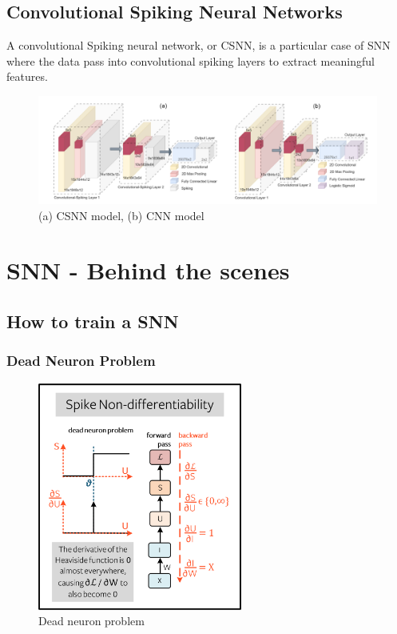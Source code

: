 \documentclass[11pt]{article}
\begin{document}
\subsection{Convolutional Spiking Neural Networks}

A convolutional Spiking neural network, or CSNN, is a particular case of SNN where the data pass into convolutional spiking layers to extract meaningful features.


\begin{figure}[H]
    \centering
    \includegraphics[width=\textwidth]{./image/csnn_template.png}
    \caption{(a) CSNN model, (b) CNN model}
    \label{fig:csnn_template}
\end{figure}

\pagebreak

\section{SNN - Behind the scenes}

\subsection{How to train a SNN}

\subsubsection{Dead Neuron Problem}

\begin{figure}
  \centering
  \includegraphics[width=0.6\textwidth]{./image/non-differentiability.png}
  \caption{Dead neuron problem\cite{eshraghian2021training}}
\end{figure}
\end{document}
